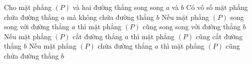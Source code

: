 \begin{ex}%
	Cho mặt phẳng $(P)$ và hai  đường thẳng song song $a$ và $b$
	 \choiceTF
		{\True Có vô số mặt phẳng  chứa đường thẳng $a$ mà không chứa đường thẳng $b$}
		{Nếu mặt phẳng $(P)$ song song với  đường thẳng $a$ thì mặt phẳng $(P)$ cũng song song với đường thẳng $b$}
		{\True Nếu mặt phẳng $(P)$ cắt đường thẳng $a$ thì mặt  phẳng $(P)$ cũng cắt đường thẳng $b$}
		{Nếu mặt phẳng  $(P)$ chứa đường thẳng $a$ thì mặt phẳng $(P)$ cũng chứa đường thẳng $b$}
\end{ex}



